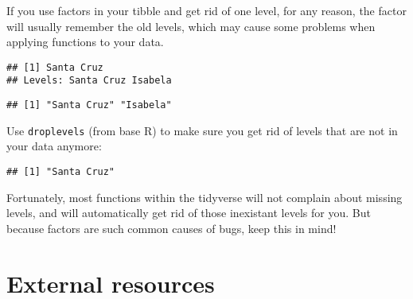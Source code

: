 \documentclass[
]{book}
\newenvironment{Shaded}{}{}
\newcommand{\CommentTok}[1]{\textcolor[rgb]{0.38,0.63,0.69}{\textit{#1}}}
\newcommand{\KeywordTok}[1]{\textcolor[rgb]{0.00,0.44,0.13}{\textbf{#1}}}
\newcommand{\NormalTok}[1]{#1}
\newcommand{\OperatorTok}[1]{\textcolor[rgb]{0.40,0.40,0.40}{#1}}
\newcommand{\StringTok}[1]{\textcolor[rgb]{0.25,0.44,0.63}{#1}}
\begin{document}
If you use factors in your tibble and get rid of one level, for any reason, the factor will usually remember the old levels, which may cause some problems when applying functions to your data.

\begin{Shaded}
\end{Shaded}

\begin{verbatim}
## [1] Santa Cruz
## Levels: Santa Cruz Isabela
\end{verbatim}

\begin{Shaded}
\end{Shaded}

\begin{verbatim}
## [1] "Santa Cruz" "Isabela"
\end{verbatim}

Use \texttt{droplevels} (from base R) to make sure you get rid of levels that are not in your data anymore:

\begin{Shaded}
\end{Shaded}

\begin{verbatim}
## [1] "Santa Cruz"
\end{verbatim}

Fortunately, most functions within the tidyverse will not complain about missing levels, and will automatically get rid of those inexistant levels for you. But because factors are such common causes of bugs, keep this in mind!

\hypertarget{external-resources}{%
\section{External resources}\label{external-resources}}
\end{document}
